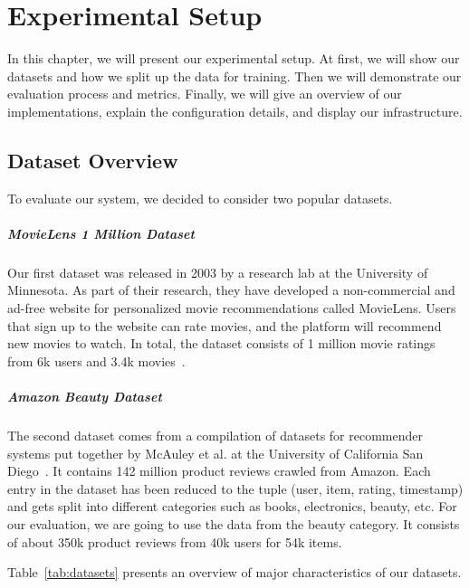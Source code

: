 \chapter{Experimental Setup}

In this chapter, we will present our experimental setup. At first, we will show our datasets and how we split up the data for training. Then we will demonstrate our evaluation process and metrics. Finally, we will give an overview of our implementations, explain the configuration details, and display our infrastructure. 

\section{Dataset Overview}

To evaluate our system, we decided to consider two popular datasets.

\paragraph{MovieLens 1 Million Dataset}
Our first dataset was released in 2003 by a research lab at the University of Minnesota. As part of their research, they have developed a non-commercial and ad-free website for personalized movie recommendations called MovieLens. Users that sign up to the website can rate movies, and the platform will recommend new movies to watch. In total, the dataset consists of 1 million movie ratings from 6k users and 3.4k movies~\cite{harper2015movielens, Movielens}.

\paragraph{Amazon Beauty Dataset}
The second dataset comes from a compilation of datasets for recommender systems put together by McAuley et al. at the University of California San Diego~\cite{Amazon}. It contains 142 million product reviews crawled from Amazon. Each entry in the dataset has been reduced to the tuple (user, item, rating, timestamp) and gets split into different categories such as books, electronics, beauty, etc. For our evaluation, we are going to use the data from the beauty category. It consists of about 350k product reviews from 40k users for 54k items.


Table~\ref{tab:datasets} presents an overview of major characteristics of our datasets.

